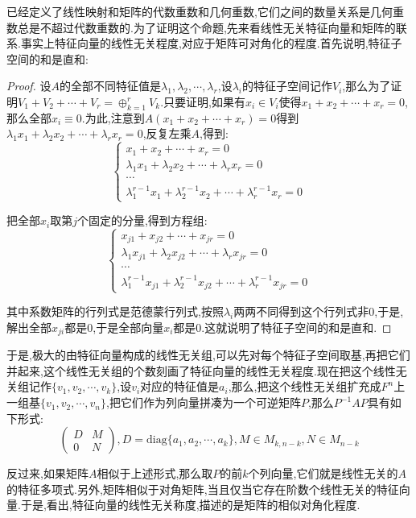 已经定义了线性映射和矩阵的代数重数和几何重数,它们之间的数量关系是几何重数总是不超过代数重数的.为了证明这个命题,先来看线性无关特征向量和矩阵的联系.事实上特征向量的线性无关程度,对应于矩阵可对角化的程度.首先说明,特征子空间的和是直和:
\begin{proof}

设$A$的全部不同特征值是$\lambda_1,\lambda_2,\cdots,\lambda_r$,设$\lambda_i$的特征子空间记作$V_i$,那么为了证明$V_1+V_2+\cdots+V_r=\oplus_{k=1}^rV_k$.只要证明,如果有$x_i\in V_i$使得$x_1+x_2+\cdots+x_r=0$,那么全部$x_i\equiv0$.为此,注意到$A(x_1+x_2+\cdots+x_r)=0$得到$\lambda_1x_1+\lambda_2x_2+\cdots+\lambda_rx_r=0$,反复左乘$A$,得到:
$$\left\{\begin{array}{c}
x_1+x_2+\cdots+x_r=0\\
\lambda_1x_1+\lambda_2x_2+\cdots+\lambda_rx_r=0\\
\cdots\\
\lambda_1^{r-1}x_1+\lambda_2^{r-1}x_2+\cdots+\lambda_r^{r-1}x_r=0
\end{array}\right.$$

把全部$x_i$取第$j$个固定的分量,得到方程组:
$$\left\{\begin{array}{c}
x_{j1}+x_{j2}+\cdots+x_{jr}=0\\
\lambda_1x_{j1}+\lambda_2x_{j2}+\cdots+\lambda_rx_{jr}=0\\
\cdots\\
\lambda_1^{r-1}x_{j1}+\lambda_2^{r-1}x_{j2}+\cdots+\lambda_r^{r-1}x_{jr}=0
\end{array}\right.$$

其中系数矩阵的行列式是范德蒙行列式,按照$\lambda_i$两两不同得到这个行列式非0,于是,解出全部$x_{ji}$都是0,于是全部向量$x_i$都是0.这就说明了特征子空间的和是直和.
\end{proof}

于是,极大的由特征向量构成的线性无关组,可以先对每个特征子空间取基,再把它们并起来,这个线性无关组的个数刻画了特征向量的线性无关程度.现在把这个线性无关组记作$\{v_1,v_2,\cdots,v_k\}$,设$v_i$对应的特征值是$a_i$,那么,把这个线性无关组扩充成$F^n$上一组基$\{v_1,v_2,\cdots,v_n\}$,把它们作为列向量拼凑为一个可逆矩阵$P$,那么$P^{-1}AP$具有如下形式:
$$\left(\begin{array}{cc}
D&M\\
0&N
\end{array}\right),D=\mathrm{diag}\{a_1,a_2,\cdots,a_k\},M\in M_{k,n-k},N\in M_{n-k}$$

反过来,如果矩阵$A$相似于上述形式,那么取$P$的前$k$个列向量,它们就是线性无关的$A$的特征多项式.另外,矩阵相似于对角矩阵,当且仅当它存在阶数个线性无关的特征向量.于是,看出,特征向量的线性无关称度,描述的是矩阵的相似对角化程度.


